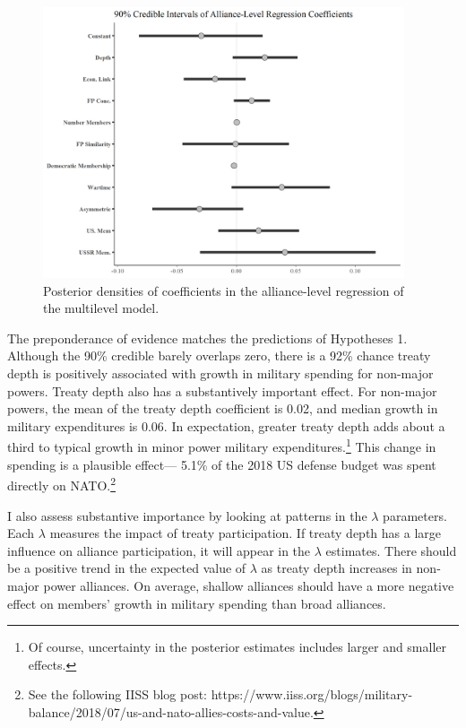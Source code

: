 \documentclass[12pt]{article}
\begin{document}
\begin{figure}[htbp]
	\centering
		\includegraphics[width=0.95\textwidth]{../figures/alliance-reg-nonmaj.png}
	\caption{Posterior densities of coefficients in the alliance-level regression of the multilevel model. }
	\label{fig:alliance-reg-nonmaj}
\end{figure}



The preponderance of evidence matches the predictions of Hypotheses 1. 
Although the 90\% credible barely overlaps zero, there is a 92\% chance treaty depth is positively associated with growth in military spending for non-major powers.
Treaty depth also has a substantively important effect. 
For non-major powers, the mean of the treaty depth coefficient is 0.02, and median growth in military expenditures is 0.06. 
In expectation, greater treaty depth adds about a third to typical growth in minor power military expenditures.\footnote{Of course, uncertainty in the posterior estimates includes larger and smaller effects.}
This change in spending is a plausible effect--- 5.1\% of the 2018 US defense budget was spent directly on NATO.\footnote{See the following IISS blog post: https://www.iiss.org/blogs/military-balance/2018/07/us-and-nato-allies-costs-and-value.} 


I also assess substantive importance by looking at patterns in the $\lambda$ parameters. 
Each $\lambda$ measures the impact of treaty participation. 
If treaty depth has a large influence on alliance participation, it will appear in the $\lambda$ estimates. 
There should be a positive trend in the expected value of $\lambda$ as treaty depth increases in non-major power alliances.
On average, shallow alliances should have a more negative effect on members' growth in military spending than broad alliances.  
\end{document}
